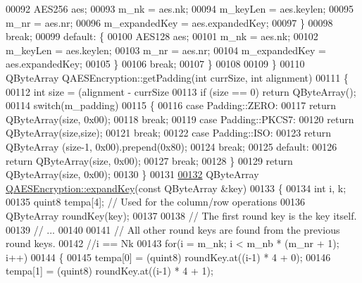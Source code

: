 \begin{DoxyCode}
00092         AES256 aes;
00093         m\_nk = aes.nk;
00094         m\_keyLen = aes.keylen;
00095         m\_nr = aes.nr;
00096         m\_expandedKey = aes.expandedKey;
00097         \}
00098         \textcolor{keywordflow}{break};
00099     \textcolor{keywordflow}{default}: \{
00100         AES128 aes;
00101         m\_nk = aes.nk;
00102         m\_keyLen = aes.keylen;
00103         m\_nr = aes.nr;
00104         m\_expandedKey = aes.expandedKey;
00105         \}
00106         \textcolor{keywordflow}{break};
00107     \}
00108 
00109 \}
00110 QByteArray QAESEncryption::getPadding(\textcolor{keywordtype}{int} currSize, \textcolor{keywordtype}{int} alignment)
00111 \{
00112     \textcolor{keywordtype}{int} size = (alignment - currSize %
00113     \textcolor{keywordflow}{if} (size == 0) \textcolor{keywordflow}{return} QByteArray();
00114     \textcolor{keywordflow}{switch}(m\_padding)
00115     \{
00116     \textcolor{keywordflow}{case} Padding::ZERO:
00117         \textcolor{keywordflow}{return} QByteArray(size, 0x00);
00118         \textcolor{keywordflow}{break};
00119     \textcolor{keywordflow}{case} Padding::PKCS7:
00120         \textcolor{keywordflow}{return} QByteArray(size,size);
00121         \textcolor{keywordflow}{break};
00122     \textcolor{keywordflow}{case} Padding::ISO:
00123         \textcolor{keywordflow}{return} QByteArray (size-1, 0x00).prepend(0x80);
00124         \textcolor{keywordflow}{break};
00125     \textcolor{keywordflow}{default}:
00126         \textcolor{keywordflow}{return} QByteArray(size, 0x00);
00127         \textcolor{keywordflow}{break};
00128     \}
00129     \textcolor{keywordflow}{return} QByteArray(size, 0x00);
00130 \}
00131 
\hypertarget{qaesencryption_8cpp_source.tex_l00132}{}\hyperlink{class_q_a_e_s_encryption_a5bfbb972f84a8376fceed648553c0912}{00132} QByteArray \hyperlink{class_q_a_e_s_encryption_a5bfbb972f84a8376fceed648553c0912}{QAESEncryption::expandKey}(\textcolor{keyword}{const} QByteArray &key)
00133 \{
00134   \textcolor{keywordtype}{int} i, k;
00135   quint8 tempa[4]; \textcolor{comment}{// Used for the column/row operations}
00136   QByteArray roundKey(key);
00137 
00138   \textcolor{comment}{// The first round key is the key itself.}
00139   \textcolor{comment}{// ...}
00140 
00141   \textcolor{comment}{// All other round keys are found from the previous round keys.}
00142   \textcolor{comment}{//i == Nk}
00143   \textcolor{keywordflow}{for}(i = m\_nk; i < m\_nb * (m\_nr + 1); i++)
00144   \{
00145     tempa[0] = (quint8) roundKey.at((i-1) * 4 + 0);
00146     tempa[1] = (quint8) roundKey.at((i-1) * 4 + 1);

\end{DoxyCode}
